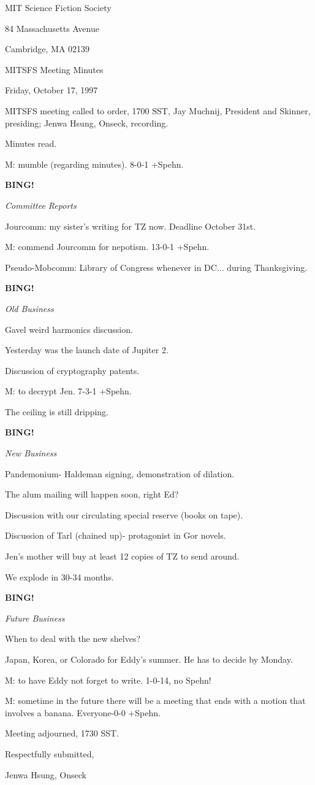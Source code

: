 \documentclass[12pt]{article}
\newcommand{\bing}{{\bf BING!} }
\newcommand{\goto}[1]{\bing \vskip 12pt \centerline{{\em{#1}}}}
\begin{document}
\begin{center}

MIT Science Fiction Society 

84 Massachusetts Avenue

Cambridge, MA 02139

\vspace{12pt}

MITSFS Meeting Minutes 

Friday, October 17, 1997

\end{center}
 
\vspace{18pt}

\setlength{\parskip}{6pt}

\noindent
MITSFS meeting called to order, 1700 SST,
Jay Muchnij, President and Skinner, presiding; Jenwa Hsung, Onseck, recording.

Minutes read.

M: mumble (regarding minutes). 8-0-1 +Spehn.

\goto{Committee Reports}

Jourcomm: my sister's writing for TZ now. Deadline October 31st.

M: commend Jourcomm for nepotism. 13-0-1 +Spehn.

Pseudo-Mobcomm: Library of Congress whenever in DC... during Thanksgiving.

\goto{Old Business}

Gavel weird harmonics discussion.

Yesterday was the launch date of Jupiter 2.

Discussion of cryptography patents.

M: to decrypt Jen. 7-3-1 +Spehn.

The ceiling is still dripping.

\goto{New Business}

Pandemonium- Haldeman signing, demonstration of dilation.

The alum mailing will happen soon, right Ed?

Discussion with our circulating special reserve (books on tape).

Discussion of Tarl (chained up)- protagonist in Gor novels.

Jen's mother will buy at least 12 copies of TZ to send around.

We explode in 30-34 months.

\goto{Future Business}

When to deal with the new shelves?

Japan, Korea, or Colorado for Eddy's summer. He has to decide by Monday.

M: to have Eddy not forget to write. 1-0-14, no Spehn!

M: sometime in the future there will be a meeting that ends with a motion that involves a banana. Everyone-0-0 +Spehn.

\vspace{12pt}

\noindent
Meeting adjourned, 1730 SST.

\vspace{18pt}

\centerline{Respectfully submitted,}
\centerline{Jenwa Hsung, Onseck}
\end{document}
